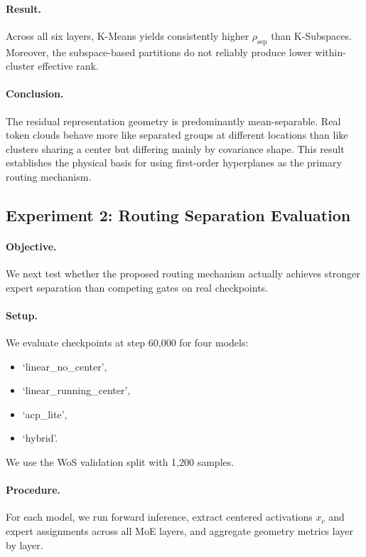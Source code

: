 \paragraph{Result.}
Across all six layers, K-Means yields consistently higher $\rho_{\mathrm{sep}}$ than K-Subspaces. Moreover, the subspace-based partitions do not reliably produce lower within-cluster effective rank.

\paragraph{Conclusion.}
The residual representation geometry is predominantly mean-separable. Real token clouds behave more like separated groups at different locations than like clusters sharing a center but differing mainly by covariance shape. This result establishes the physical basis for using first-order hyperplanes as the primary routing mechanism.

\subsection{Experiment 2: Routing Separation Evaluation}
\paragraph{Objective.}
We next test whether the proposed routing mechanism actually achieves stronger expert separation than competing gates on real checkpoints.

\paragraph{Setup.}
We evaluate checkpoints at step 60{,}000 for four models:
\begin{itemize}
    \item `linear\_no\_center',
    \item `linear\_running\_center',
    \item `acp\_lite',
    \item `hybrid'.
\end{itemize}
We use the WoS validation split with 1{,}200 samples.

\paragraph{Procedure.}
For each model, we run forward inference, extract centered activations $x_c$ and expert assignments across all MoE layers, and aggregate geometry metrics layer by layer.

